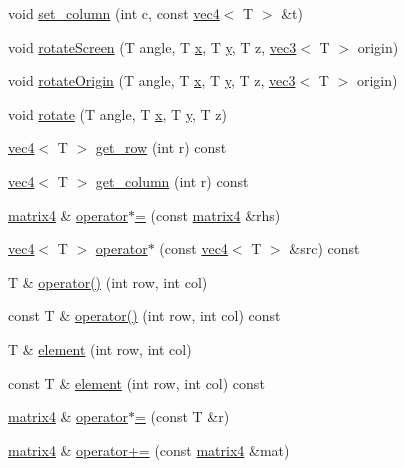 \begin{CompactItemize}
\item 
void \hyperlink{classnv_1_1matrix4_9a8f45e4b6f47e49074e27c5a5bb5ed6}{set\_\-column} (int c, const \hyperlink{classnv_1_1vec4}{vec4}$<$ T $>$ \&t)
\item 
void \hyperlink{classnv_1_1matrix4_0ce61396b900fbfeb6ac3cb93fb43a07}{rotateScreen} (T angle, T \hyperlink{mouse_8cpp_6150e0515f7202e2fb518f7206ed97dc}{x}, T \hyperlink{mouse_8cpp_0a2f84ed7838f07779ae24c5a9086d33}{y}, T z, \hyperlink{classnv_1_1vec3}{vec3}$<$ T $>$ origin)
\item 
void \hyperlink{classnv_1_1matrix4_addeaba225f0322e3819cc146b7a9887}{rotateOrigin} (T angle, T \hyperlink{mouse_8cpp_6150e0515f7202e2fb518f7206ed97dc}{x}, T \hyperlink{mouse_8cpp_0a2f84ed7838f07779ae24c5a9086d33}{y}, T z, \hyperlink{classnv_1_1vec3}{vec3}$<$ T $>$ origin)
\item 
void \hyperlink{classnv_1_1matrix4_219e377b04b656c751c6d5ebdaa3505b}{rotate} (T angle, T \hyperlink{mouse_8cpp_6150e0515f7202e2fb518f7206ed97dc}{x}, T \hyperlink{mouse_8cpp_0a2f84ed7838f07779ae24c5a9086d33}{y}, T z)
\item 
\hyperlink{classnv_1_1vec4}{vec4}$<$ T $>$ \hyperlink{classnv_1_1matrix4_8570ef93f472de8b22871dc0eeae063f}{get\_\-row} (int r) const 
\item 
\hyperlink{classnv_1_1vec4}{vec4}$<$ T $>$ \hyperlink{classnv_1_1matrix4_994cf662df66cef73f1b53ac6b522c35}{get\_\-column} (int r) const 
\item 
\hyperlink{classnv_1_1matrix4}{matrix4} \& \hyperlink{classnv_1_1matrix4_952abc3f6b02fc318e488d3267db6111}{operator$\ast$=} (const \hyperlink{classnv_1_1matrix4}{matrix4} \&rhs)
\item 
\hyperlink{classnv_1_1vec4}{vec4}$<$ T $>$ \hyperlink{classnv_1_1matrix4_f57c6161e485a6b7e518dab91479f94b}{operator$\ast$} (const \hyperlink{classnv_1_1vec4}{vec4}$<$ T $>$ \&src) const 
\item 
T \& \hyperlink{classnv_1_1matrix4_bb80585790ba8ec85d80539f0ebcd488}{operator()} (int row, int col)
\item 
const T \& \hyperlink{classnv_1_1matrix4_eb010106f27df3248d2ad4086c4bb4f5}{operator()} (int row, int col) const 
\item 
T \& \hyperlink{classnv_1_1matrix4_82c7f1a1c17765f07c2fba4f2f231dd3}{element} (int row, int col)
\item 
const T \& \hyperlink{classnv_1_1matrix4_a08fdc3168b2195b23cf46e55fc7352d}{element} (int row, int col) const 
\item 
\hyperlink{classnv_1_1matrix4}{matrix4} \& \hyperlink{classnv_1_1matrix4_f0a4ab9a41801f1468cc2502591739ec}{operator$\ast$=} (const T \&r)
\item 
\hyperlink{classnv_1_1matrix4}{matrix4} \& \hyperlink{classnv_1_1matrix4_2678da2a1c5888217e9b73c5415d6164}{operator+=} (const \hyperlink{classnv_1_1matrix4}{matrix4} \&mat)
\end{CompactItemize}
